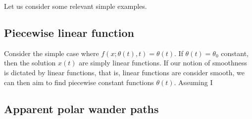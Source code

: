 \label{section:examples}

Let us consider some relevant simple examples. 

\subsection{Piecewise linear function}

Consider the simple case where $f(x; \theta(t), t) = \theta(t)$.
If $\theta(t) = \theta_0$ constant, then the solution $x(t)$ are simply linear functions. 
If our notion of smoothness is dictated by linear functions, that is, linear functions are consider smooth, we can then aim to find piecewise constant functions $\theta(t)$.
Assuming I

\subsection{Apparent polar wander paths}
